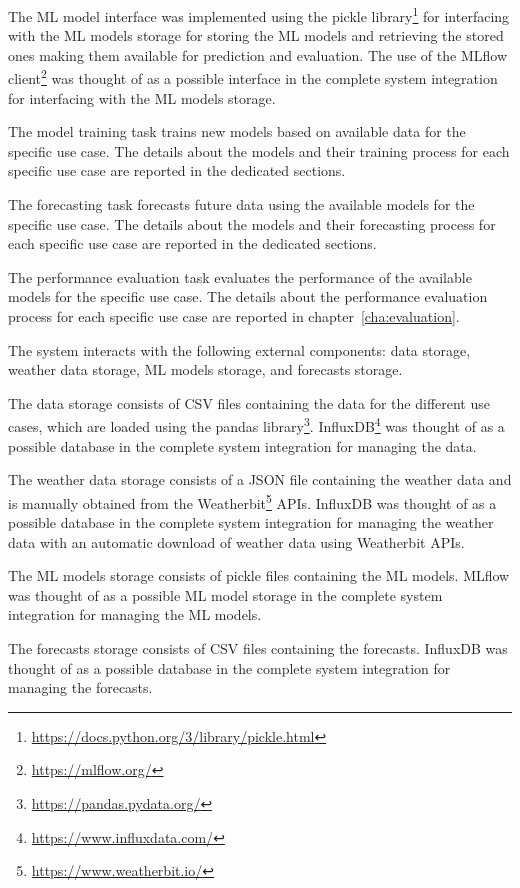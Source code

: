 The ML model interface was implemented using the pickle library\footnote{ \url{https://docs.python.org/3/library/pickle.html} } for interfacing with the ML models storage for storing the ML models and retrieving the stored ones making them available for prediction and evaluation.
The use of the MLflow client\footnote{ \url{https://mlflow.org/} } was thought of as a possible interface in the complete system integration for interfacing with the ML models storage.

The model training task trains new models based on available data for the specific use case.
The details about the models and their training process for each specific use case are reported in the dedicated sections.

The forecasting task forecasts future data using the available models for the specific use case.
The details about the models and their forecasting process for each specific use case are reported in the dedicated sections.

The performance evaluation task evaluates the performance of the available models for the specific use case.
The details about the performance evaluation process for each specific use case are reported in chapter~\ref{cha:evaluation}.

The system interacts with the following external components: data storage, weather data storage, ML models storage, and forecasts storage.

The data storage consists of CSV files containing the data for the different use cases, which are loaded using the pandas library\footnote{ \url{https://pandas.pydata.org/} }.
InfluxDB\footnote{ \url{https://www.influxdata.com/} } was thought of as a possible database in the complete system integration for managing the data.

The weather data storage consists of a JSON file containing the weather data and is manually obtained from the Weatherbit\footnote{ \url{https://www.weatherbit.io/} } APIs.
InfluxDB was thought of as a possible database in the complete system integration for managing the weather data with an automatic download of weather data using Weatherbit APIs.

The ML models storage consists of pickle files containing the ML models.
MLflow was thought of as a possible ML model storage in the complete system integration for managing the ML models.

The forecasts storage consists of CSV files containing the forecasts.
InfluxDB was thought of as a possible database in the complete system integration for managing the forecasts.

